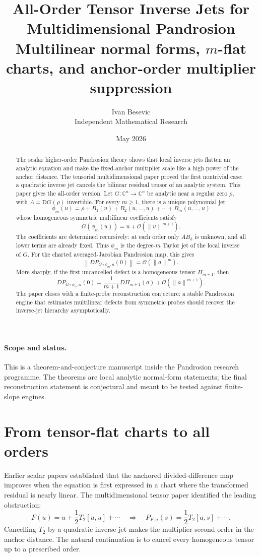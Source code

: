 \documentclass[11pt]{article}
\title{All-Order Tensor Inverse Jets for Multidimensional Pandrosion\\[3pt]
\large Multilinear normal forms, $m$-flat charts, and anchor-order multiplier suppression}
\author{Ivan Besevic\\Independent Mathematical Research}
\date{May 2026}
\newcommand{\C}{\mathbb C}
\newcommand{\Oterm}{\mathcal O}
\newcommand{\D}{\mathrm D}
\newcommand{\norm}[1]{\left\lVert #1\right\rVert}
\begin{document}
\maketitle

\begin{abstract}
The scalar higher-order Pandrosion theory shows that local inverse jets flatten an analytic equation and make the fixed-anchor multiplier scale like a high power of the anchor distance. The tensorial multidimensional paper proved the first nontrivial case: a quadratic inverse jet cancels the bilinear residual tensor of an analytic system. This paper gives the all-order version. Let \(G:\C^n\to\C^n\) be analytic near a regular zero \(\rho\), with \(A=\D G(\rho)\) invertible. For every \(m\ge1\), there is a unique polynomial jet
\[
        \phi_m(u)=\rho+B_1(u)+B_2(u,\ldots,u)+\cdots+B_m(u,\ldots,u)
\]
whose homogeneous symmetric multilinear coefficients satisfy
\[
        G(\phi_m(u))=u+\Oterm(\norm{u}^{m+1}).
\]
The coefficients are determined recursively: at each order only \(A B_k\) is unknown, and all lower terms are already fixed. Thus \(\phi_m\) is the degree-\(m\) Taylor jet of the local inverse of \(G\). For the charted averaged-Jacobian Pandrosion map, this gives
\[
        \norm{D P_{G\circ\phi_m,a}(0)}=\Oterm(\norm{a}^{m}).
\]
More sharply, if the first uncancelled defect is a homogeneous tensor \(H_{m+1}\), then
\[
        D P_{G\circ\phi_m,a}(0)
        =
        \frac{1}{m+1}D H_{m+1}(a)+\Oterm(\norm{a}^{m+1}).
\]
The paper closes with a finite-probe reconstruction conjecture: a stable Pandrosion engine that estimates multilinear defects from symmetric probes should recover the inverse-jet hierarchy asymptotically.
\end{abstract}

\paragraph{Scope and status.}
This is a theorem-and-conjecture manuscript inside the Pandrosion research programme. The theorems are local analytic normal-form statements; the final reconstruction statement is conjectural and meant to be tested against finite-slope engines.

\section{From tensor-flat charts to all orders}

Earlier scalar papers established that the anchored divided-difference map improves when the equation is first expressed in a chart where the transformed residual is nearly linear. The multidimensional tensor paper identified the leading obstruction:
\[
        F(u)=u+\frac12 T_2[u,u]+\cdots
        \quad\Longrightarrow\quad
        P_{F,a}(s)=\frac12 T_2[a,s]+\cdots .
\]
Cancelling \(T_2\) by a quadratic inverse jet makes the multiplier second order in the anchor distance. The natural continuation is to cancel every homogeneous tensor up to a prescribed order.
\end{document}
